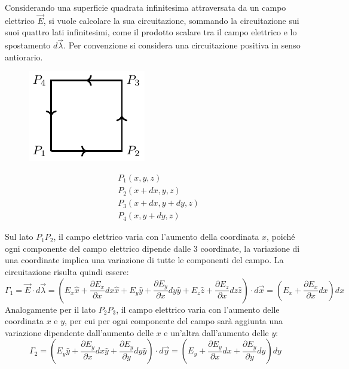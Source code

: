 \documentclass{article}
\numberwithin{equation}{subsection}
\begin{document}
Considerando una superficie quadrata infinitesima attraversata da un campo elettrico $\vec{E}$, si vuole calcolare la sua circuitazione, sommando la circuitazione sui suoi 
quattro lati infinitesimi, come il prodotto scalare tra il campo elettrico e lo spostamento $d\vec{\lambda}$. Per convenzione si considera una circuitazione positiva in senso 
antiorario. 
\begin{figure}[H]%
    \centering
    \includegraphics{teorema-rotore.pdf}
    \label{fig:toeorema-rotore}
\end{figure}
\begin{align*}
    &P_1(x,y,z)\\
    &P_2(x+dx,y,z)\\
    &P_3(x+dx,y+dy,z)\\
    &P_4(x,y+dy,z)
\end{align*}

Sul lato $P_1P_2$, il campo elettrico varia con l'aumento della coordinata $x$, poiché ogni componente del campo elettrico dipende dalle $3$ coordinate, la variazione di una 
coordinate implica una variazione di tutte le componenti del campo. La circuitazione risulta quindi essere:
\begin{equation*}
    \Gamma_1=\vec{E}\cdot d\vec{\lambda}=\left(E_x\hat{x}+\displaystyle\frac{\partial E_x}{\partial x}dx\hat{x}+E_y\hat{y}+\frac{\partial E_y}{\partial x}dy\hat{y}+E_z\hat{z}+\frac{\partial E_z}{\partial x}dz\hat{z}\right)\cdot d\vec{x}=\left(E_x+\frac{\partial E_x}{\partial x}dx\right)dx
\end{equation*}
Analogamente per il lato $P_2P_3$, il campo elettrico varia con l'aumento delle coordinata $x$ e $y$, per cui per ogni componente del campo sarà aggiunta una variazione dipendente 
dall'aumento delle $x$ e un'altra dall'aumento delle $y$:
\begin{equation*}
    \Gamma_2=\left(E_y\hat{y}+\displaystyle\frac{\partial E_y}{\partial x}dx\hat{y}+\frac{\partial E_y}{\partial y}dy\hat{y}\right)\cdot d\vec{y}=\left(E_y+\frac{\partial E_y}{\partial x}dx+\frac{\partial E_y}{\partial y}dy\right)dy
\end{equation*}
\end{document}

